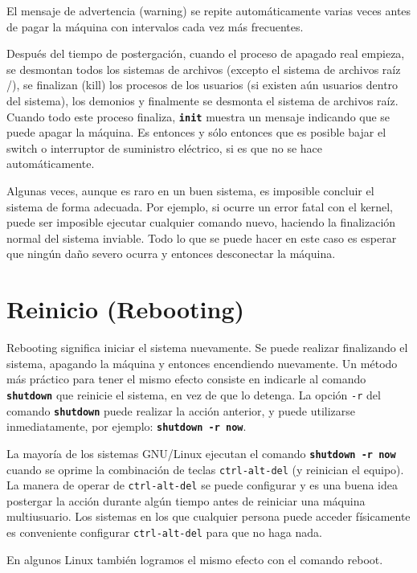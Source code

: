 \documentclass[12pt]{article}
\begin{document}
El mensaje de advertencia (warning)
se repite automáticamente varias veces antes de pagar la máquina con
intervalos cada vez más frecuentes.

 Después del tiempo de postergación, cuando el proceso de apagado real
empieza, se desmontan todos los sistemas de archivos (excepto el sistema de
archivos raíz /), se finalizan (kill) los procesos de los usuarios (si existen
aún usuarios dentro del sistema), los demonios y finalmente se desmonta el
sistema de archivos raíz. Cuando todo este proceso finaliza,
\texttt{\textbf{init}} muestra un mensaje indicando que se puede apagar la
máquina. Es entonces y sólo entonces que es posible bajar el switch o
interruptor de suministro eléctrico, si es que no se hace automáticamente.

 Algunas veces, aunque es raro en un buen sistema, es imposible concluir
el sistema de forma adecuada. Por ejemplo, si ocurre un error fatal con el
kernel, puede ser imposible ejecutar cualquier comando nuevo, haciendo la
finalización normal del sistema inviable. Todo lo que se puede hacer en este
caso es esperar que ningún daño severo ocurra y entonces desconectar la máquina.


\section{ Reinicio (Rebooting)}

 Rebooting significa iniciar el sistema nuevamente. Se puede realizar
finalizando el sistema, apagando la máquina y entonces encendiendo nuevamente. Un
método más práctico para tener el mismo efecto consiste en indicarle al comando
\texttt{\textbf{shutdown}} que reinicie el sistema, en vez de que lo detenga.
La opción \texttt{-r} del comando \texttt{\textbf{shutdown}} puede
realizar la acción anterior, y puede utilizarse inmediatamente, por ejemplo:
\texttt{\textbf{shutdown -r now}}.  

 La mayoría de los sistemas GNU/Linux ejecutan el comando \texttt{\textbf{shutdown -r
now}} cuando se oprime la combinación de teclas \texttt{ctrl-alt-del} (y
reinician el equipo). La manera de operar de \texttt{ctrl-alt-del} se puede configurar y
es una buena idea postergar la acción durante algún tiempo antes de reiniciar
una máquina multiusuario. Los sistemas en los que cualquier persona puede
acceder físicamente es conveniente configurar \texttt{ctrl-alt-del} para que no haga
nada.

En algunos Linux también logramos el mismo efecto con el comando reboot.
\end{document}
